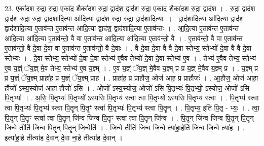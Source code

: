 \documentclass[17pt]{extarticle}
\begin{document}
23. एका॑दश रु॒द्रा रु॒द्रा एका॑द॒ शैका॑दश रु॒द्रा द्वाद॑श॒ द्वाद॑श रु॒द्रा एका॑द॒ शैका॑दश रु॒द्रा द्वाद॑श । . रु॒द्रा द्वाद॑श॒ द्वाद॑श रु॒द्रा रु॒द्रा द्वाद॑शादि॒त्या आ॑दि॒त्या द्वाद॑श रु॒द्रा रु॒द्रा द्वाद॑शादि॒त्याः । . द्वाद॑शादि॒त्या आ॑दि॒त्या द्वाद॑श॒ द्वाद॑शादि॒त्या ए॒ताव॑न्त ए॒ताव॑न्त आदि॒त्या द्वाद॑श॒ द्वाद॑शादि॒त्या ए॒ताव॑न्तः । . आ॒दि॒त्या ए॒ताव॑न्त ए॒ताव॑न्त आदि॒त्या आ॑दि॒त्या ए॒ताव॑न्तो॒ वै वा ए॒ताव॑न्त आदि॒त्या आ॑दि॒त्या ए॒ताव॑न्तो॒ वै । . ए॒ताव॑न्तो॒ वै वा ए॒ताव॑न्त ए॒ताव॑न्तो॒ वै दे॒वा दे॒वा वा ए॒ताव॑न्त ए॒ताव॑न्तो॒ वै दे॒वाः । . वै दे॒वा दे॒वा वै वै दे॒वा स्तेभ्य॒ स्तेभ्यो॑ दे॒वा वै वै दे॒वा स्तेभ्यः॑ । . दे॒वा स्तेभ्य॒ स्तेभ्यो॑ दे॒वा दे॒वा स्तेभ्य॑ ए॒वैव तेभ्यो॑ दे॒वा दे॒वा स्तेभ्य॑ ए॒व । . तेभ्य॑ ए॒वैव तेभ्य॒ स्तेभ्य॑ ए॒व य॒ज्ञ्ं ॅय॒ज्ञ् मे॒व तेभ्य॒ स्तेभ्य॑ ए॒व य॒ज्ञ्म् । . ए॒व य॒ज्ञ्ं ॅय॒ज्ञ् मे॒वैव य॒ज्ञ्म् प्र प्र य॒ज्ञ् मे॒वैव य॒ज्ञ्म् प्र । . य॒ज्ञ्म् प्र प्र य॒ज्ञ्ं ॅय॒ज्ञ्म् प्राहा॑ह॒ प्र य॒ज्ञ्ं ॅय॒ज्ञ्म् प्राह॑ । . प्राहा॑ह॒ प्र प्राहौज॒ ओज॑ आह॒ प्र प्राहौजः॑ । . आ॒हौज॒ ओज॑ आहा॒ हौजो᳚ ऽस्य॒स्योज॑ आहा॒ हौजो॑ ऽसि । . ओजो᳚ ऽस्य॒स्योज॒ ओजो॑ ऽसि पि॒तृभ्यः॑ पि॒तृभ्यो॒ ऽस्योज॒ ओजो॑ ऽसि पि॒तृभ्यः॑ । . अ॒सि॒ पि॒तृभ्यः॑ पि॒तृभ्यो᳚ ऽस्यसि पि॒तृभ्य॑ स्त्वा त्वा पि॒तृभ्यो᳚ ऽस्यसि पि॒तृभ्य॑ स्त्वा । . पि॒तृभ्य॑ स्त्वा त्वा पि॒तृभ्यः॑ पि॒तृभ्य॑ स्त्वा पि॒तॄन् पि॒तॄꣳ स्त्वा॑ पि॒तृभ्यः॑ पि॒तृभ्य॑ स्त्वा पि॒तॄन् । . पि॒तृभ्य॒ इति॑ पि॒तृ - भ्यः॒ । . त्वा॒ पि॒तॄन् पि॒तॄꣳ स्त्वा᳚ त्वा पि॒तॄन् जि॑न्व जिन्व पि॒तॄꣳ स्त्वा᳚ त्वा पि॒तॄन् जि॑न्व । . पि॒तॄन् जि॑न्व जिन्व पि॒तॄन् पि॒तॄन् जि॒न्वे तीति॑ जिन्व पि॒तॄन् पि॒तॄन् जि॒न्वेति॑ । . जि॒न्वे तीति॑ जिन्व जि॒न्वे त्या॑हा॒हेति॑ जिन्व जि॒न्वे त्या॑ह । . इत्या॑हा॒हे तीत्या॑ह दे॒वान् दे॒वा ना॒हे तीत्या॑ह दे॒वान् । \newline
\end{document}
